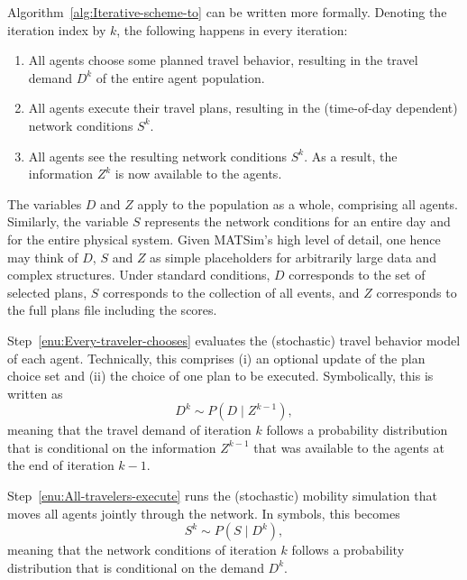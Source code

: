 Algorithm~\ref{alg:Iterative-scheme-to} can be written more formally.
Denoting the iteration index by $k$, the following happens in every
iteration:
\begin{enumerate}
\item \label{enu:Every-traveler-chooses}All agents choose some planned
travel behavior, resulting in the travel demand $D^{k}$ of the entire
agent population.
\item \label{enu:All-travelers-execute}All agents execute their travel
plans, resulting in the (time-of-day dependent) network conditions
$S^{k}$.
\item \label{enu:All-travelers-observe}All agents see the resulting network
conditions $S^{k}$. As a result, the information $Z^{k}$ is now
available to the agents.
\end{enumerate}
The variables $D$ and $Z$ apply to the population as a whole, comprising
all agents. Similarly, the variable $S$ represents the network conditions
for an entire day and for the entire physical system. Given MATSim's
high level of detail, one hence may think of $D$, $S$ and $Z$ as
simple placeholders for arbitrarily large data and complex structures.
  Under standard conditions, $D$ corresponds to the set of selected plans, $S$ corresponds to the collection of all events, and $Z$ corresponds to the full plans file including the scores.

Step~\ref{enu:Every-traveler-chooses} evaluates the (stochastic)
travel behavior model of each agent. Technically, this comprises (i)
an optional update of the plan choice set and (ii) the choice of one
plan to be executed. Symbolically, this is written as
\begin{equation}
D^{k}\sim P(D\mid Z^{k-1}),\label{eq:choice-model}
\end{equation}
meaning that the travel demand of iteration $k$ follows a probability
distribution that is conditional on the information $Z^{k-1}$ that
was available to the agents at the end of iteration $k-1$.

Step~\ref{enu:All-travelers-execute} runs the (stochastic) mobility
simulation that moves all agents jointly through the network. In symbols,
this becomes
\begin{equation}
S^{k}\sim P(S\mid D^{k}),\label{eq:network-loading-model}
\end{equation}
meaning that the network conditions of iteration $k$ follows a probability
distribution that is conditional on the demand $D^{k}$. 

